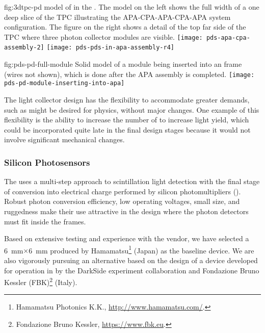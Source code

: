\begin{dunefigure}{fig:3dtpc-pd}
{\threed model of  in the . The model on the left shows the full width of a one  deep slice of the TPC illustrating the APA-CPA-APA-CPA-APA system configuration. The figure on the right shows a detail of the top far side of the TPC where three photon collector modules are visible.}
\texttt{[image: pds-apa-cpa-assembly-2]}
\texttt{[image: pds-pds-in-apa-assembly-r4]}
\end{dunefigure}

\begin{dunefigure}{fig:pds-pd-full-module}
{Solid model of a  module being inserted into an  frame (wires not shown), which is done after the APA assembly is completed.}
\texttt{[image: pds-pd-module-inserting-into-apa]}
\end{dunefigure}

The  light collector design has the flexibility to accommodate greater demands, such as might be desired for  physics, without major changes. One example of this flexibility is the ability to increase the number of  to increase light yield, which could be incorporated quite late in the final design stages because it would not involve significant mechanical changes.

\subsubsection{Silicon Photosensors} 
\label{sssec:photosensors}

The   uses a multi-step approach to scintillation light detection with the final stage of conversion into electrical charge performed by silicon photomultipliers (). Robust photon conversion efficiency, low operating voltages, small size, and ruggedness make their use attractive in the \single design where the photon detectors must fit inside the  frames. 

Based on extensive testing and experience with the vendor, we have selected a \SI{6}{mm}$\times$\SI{6}{mm}  %
produced by Hamamatsu\footnote{Hamamatsu\texttrademark{} Photonics K.K., \url{http://www.hamamatsu.com/}.} (Japan) as the baseline  device. 
We are also vigorously pursuing an alternative based on the design of a device developed for operation in \lar by the DarkSide experiment collaboration and Fondazione Bruno Kessler (FBK)\footnote{Fondazione Bruno Kessler\texttrademark{}, \url{https://www.fbk.eu}.} (Italy).

